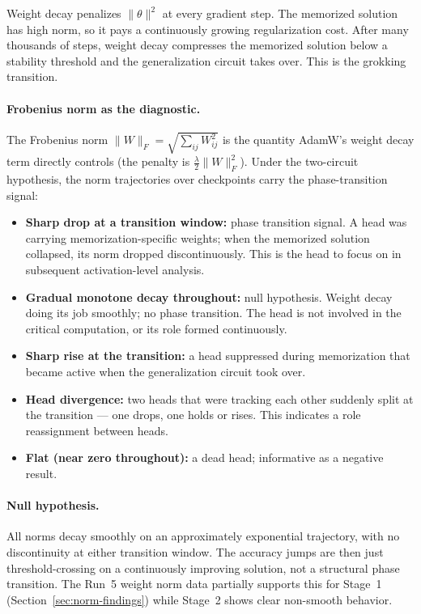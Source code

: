 \documentclass[11pt, a4paper]{article}
\begin{document}
Weight decay penalizes $\|\theta\|^2$ at every gradient step. The memorized
solution has high norm, so it pays a continuously growing regularization cost.
After many thousands of steps, weight decay compresses the memorized solution
below a stability threshold and the generalization circuit takes over. This is
the grokking transition.

\paragraph{Frobenius norm as the diagnostic.}
The Frobenius norm $\|W\|_F = \sqrt{\sum_{ij} W_{ij}^2}$ is the quantity
AdamW's weight decay term directly controls (the penalty is
$\tfrac{\lambda}{2}\|W\|_F^2$). Under the two-circuit hypothesis, the norm
trajectories over checkpoints carry the phase-transition signal:

\begin{itemize}[noitemsep]
  \item \textbf{Sharp drop at a transition window:} phase transition signal.
    A head was carrying memorization-specific weights; when the memorized
    solution collapsed, its norm dropped discontinuously. This is the head
    to focus on in subsequent activation-level analysis.
  \item \textbf{Gradual monotone decay throughout:} null hypothesis.
    Weight decay doing its job smoothly; no phase transition. The head is
    not involved in the critical computation, or its role formed continuously.
  \item \textbf{Sharp rise at the transition:} a head suppressed during
    memorization that became active when the generalization circuit took over.
  \item \textbf{Head divergence:} two heads that were tracking each other
    suddenly split at the transition --- one drops, one holds or rises.
    This indicates a role reassignment between heads.
  \item \textbf{Flat (near zero throughout):} a dead head; informative
    as a negative result.
\end{itemize}

\paragraph{Null hypothesis.}
All norms decay smoothly on an approximately exponential trajectory, with no
discontinuity at either transition window. The accuracy jumps are then just
threshold-crossing on a continuously improving solution, not a structural phase
transition. The Run~5 weight norm data partially supports this for Stage~1
(Section~\ref{sec:norm-findings}) while Stage~2 shows clear non-smooth behavior.
\end{document}

